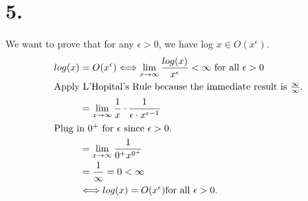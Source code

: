 \documentclass[11pt]{article}
\begin{document}
\section*{5.}
We want to prove that for any $\epsilon > 0$, we have log $x \in O(x^\epsilon)$.
\begin{align*}
    log(x) &= O(x^\epsilon) \Longleftrightarrow \lim_{x \to \infty} \frac{log(x)}{x^\epsilon} < \infty \text{ for all } \epsilon > 0&\\
    \intertext{Apply L'Hopital's Rule because the immediate result is $\frac{\infty}{\infty}$.}
    & = \lim_{x \to \infty} \frac{1}{x} \cdot \frac{1}{\epsilon \cdot x^{\epsilon - 1}}& \\
    \intertext{Plug in $0^+$ for $\epsilon$ since $\epsilon > 0$.}
    & = \lim_{x \to \infty} \frac{1}{0^{+}x^{0^+}} \\
    &= \frac{1}{\infty} = 0 < \infty \\
    &\Longleftrightarrow log(x) = O(x^\epsilon) \text{for all $\epsilon > 0$.}&
\end{align*}
\end{document}
